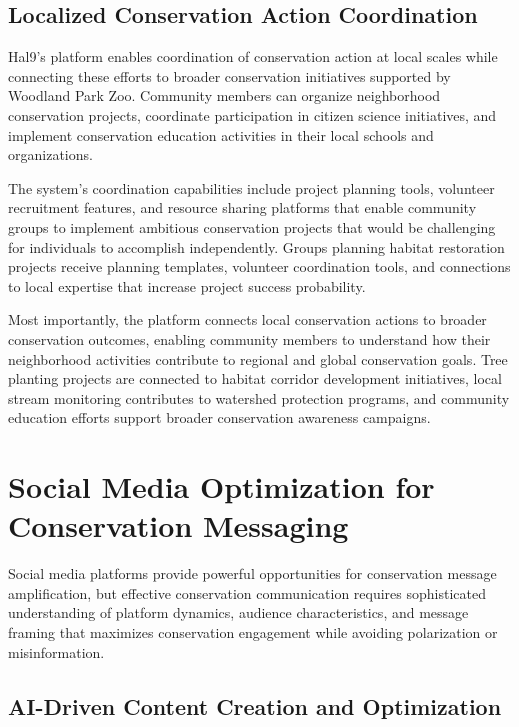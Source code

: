 \documentclass[
  Letterpaper,
]{scrbook}
\begin{document}
\subsection{Localized Conservation Action
Coordination}\label{localized-conservation-action-coordination}

Hal9's platform enables coordination of conservation action at local
scales while connecting these efforts to broader conservation
initiatives supported by Woodland Park Zoo. Community members can
organize neighborhood conservation projects, coordinate participation in
citizen science initiatives, and implement conservation education
activities in their local schools and organizations.

The system's coordination capabilities include project planning tools,
volunteer recruitment features, and resource sharing platforms that
enable community groups to implement ambitious conservation projects
that would be challenging for individuals to accomplish independently.
Groups planning habitat restoration projects receive planning templates,
volunteer coordination tools, and connections to local expertise that
increase project success probability.

Most importantly, the platform connects local conservation actions to
broader conservation outcomes, enabling community members to understand
how their neighborhood activities contribute to regional and global
conservation goals. Tree planting projects are connected to habitat
corridor development initiatives, local stream monitoring contributes to
watershed protection programs, and community education efforts support
broader conservation awareness campaigns.

\section{Social Media Optimization for Conservation
Messaging}\label{social-media-optimization-for-conservation-messaging}

Social media platforms provide powerful opportunities for conservation
message amplification, but effective conservation communication requires
sophisticated understanding of platform dynamics, audience
characteristics, and message framing that maximizes conservation
engagement while avoiding polarization or misinformation.

\subsection{AI-Driven Content Creation and
Optimization}\label{ai-driven-content-creation-and-optimization}
\end{document}
